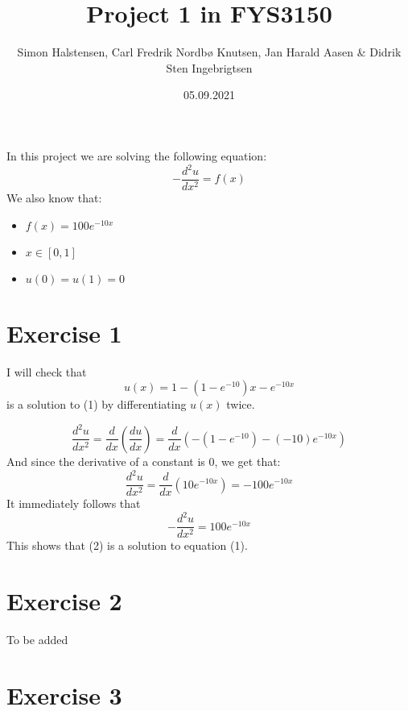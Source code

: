 \documentclass[11pt]{article} %
\title{Project 1 in FYS3150}
\author{Simon Halstensen, Carl Fredrik Nordbø Knutsen, Jan Harald Aasen \& Didrik Sten Ingebrigtsen}
\date{05.09.2021} %
\begin{document}
\maketitle
In this project we are solving the following equation:
\begin{equation} - \dfrac{d^2u}{dx^2} = f(x) \end{equation}
We also know that:
\begin{itemize}
	\item \(f(x) = 100e^{-10x}\)
	\item \(x \in [0, 1]\)
	\item \(u(0)=u(1)=0\)
\end{itemize}

\section*{Exercise 1}


I will check that 
\begin{equation}  u(x) = 1 - (1- e^{-10})x -e^{-10x} \end{equation}
is a solution to (1) by differentiating \(u(x)\) twice. 

\[\dfrac{d^2u}{dx^2} =\dfrac{d}{dx}(\dfrac{du}{dx}) = \dfrac{d}{dx}( -(1 - e^{-10}) - (-10)e^{-10x})\]
And since the derivative of a constant is 0, we get that: 
\[\dfrac{d^2u}{dx^2} = \dfrac{d}{dx}(10e^{-10x}) = -100e^{-10x}\]
It immediately follows that
\[ - \dfrac{d^2u}{dx^2} = 100e^{-10x}\]
This shows that (2) is a solution to equation (1).

\section*{Exercise 2}

To be added

\section*{Exercise 3}
\end{document}
